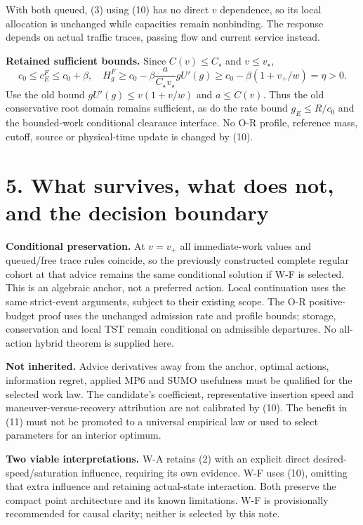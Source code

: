 \documentclass[11pt,a4paper]{article}
\begin{document}
With both queued, (3) using (10) has no direct $v$ dependence, so its local
allocation is unchanged while capacities remain nonbinding. The response
depends on actual traffic traces, passing flow and current service instead.

\textbf{Retained sufficient bounds.} Since $C(v)\leq C_\star$ and
$v\leq v_\star$,
\begin{equation}
c_0\leq c_E^{F}\leq c_0+\beta,\quad
H_g^{F}\geq c_0-\beta\frac{a}{C_\star v_\star}gU'(g)
\geq c_0-\beta(1+v_+/w)=\eta>0.\tag{12}
\end{equation}
Use the old bound $gU'(g)\leq v(1+v/w)$ and $a\leq C(v)$.
Thus the old conservative root domain remains sufficient, as do the
rate bound $g_E\leq R/c_0$ and the bounded-work conditional clearance
interface. No O-R profile, reference mass, cutoff, source or physical-time
update is changed by (10).

\newpage
\section*{5. What survives, what does not, and the decision boundary}
\textbf{Conditional preservation.} At $v=v_+$ all immediate-work values
and queued/free trace rules coincide, so the previously constructed complete
regular cohort at that advice remains the same conditional solution if
W-F is selected. This is an algebraic anchor, not a preferred action.
Local continuation uses the same strict-event arguments, subject to their
existing scope. The O-R positive-budget proof uses the unchanged admission
rate and profile bounds; storage, conservation and local TST remain conditional on
admissible departures. No all-action hybrid theorem is supplied here.

\textbf{Not inherited.} Advice derivatives away from the anchor, optimal
actions, information regret, applied MP6 and SUMO usefulness must be qualified
for the selected work law. The candidate's coefficient, representative
insertion speed and maneuver-versus-recovery attribution are not calibrated
by (10). The benefit in (11) must not be promoted to a universal empirical
law or used to select parameters for an interior optimum.

\textbf{Two viable interpretations.} W-A retains (2) with an explicit
direct desired-speed/saturation influence, requiring its own evidence.
W-F uses (10), omitting that extra influence and retaining actual-state
interaction. Both preserve the compact point architecture and its known
limitations. W-F is provisionally recommended for causal clarity; neither
is selected by this note.
\end{document}
